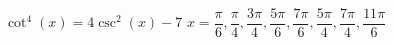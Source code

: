 { $\cot^{4}(x) = 4\csc^{2}(x) - 7$}
{ $x = \dfrac{\pi}{6}, \dfrac{\pi}{4}, \dfrac{3\pi}{4}, \dfrac{5\pi}{6}, \dfrac{7\pi}{6}, \dfrac{5\pi}{4}, \dfrac{7\pi}{4}, \dfrac{11\pi}{6}$}
